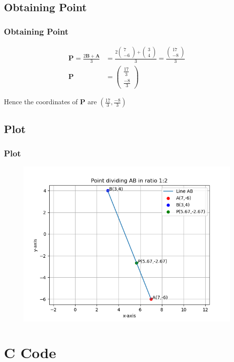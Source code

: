 \documentclass{beamer}
\providecommand{\brak}[1]{\ensuremath{\left(#1\right)}}
\theoremstyle{remark}
\newcommand{\myvec}[1]{\ensuremath{\begin{pmatrix}#1\end{pmatrix}}}
\let\vec\mathbf
\numberwithin{equation}{section}
\begin{document}
\subsection{Obtaining Point}
\begin{frame}
\frametitle{Obtaining Point}

\begin{align}
\vec{P}=\frac{2\vec{B}+\vec{A}}{3}&=\frac{2\myvec{7\\-6}+\myvec{3\\4}}{3}=\frac{\myvec{17\\-8}}{3} \\
\vec{P}
&=\myvec{\frac{17}{3}\\\frac{-8}{3}}
\end{align}

Hence the coordinates of $\vec{P}$ are $\brak{\frac{17}{3},\frac{-8}{3}}$


\end{frame}

\subsection{Plot}
\begin{frame}[fragile]
\frametitle{Plot}

\begin{figure}[h!]
   \centering
   \includegraphics[width=0.9\linewidth]{figs/plot.png}
	\caption{}
   \label{stemplot}
\end{figure}
\end{frame}

\section{C Code}
\end{document}
